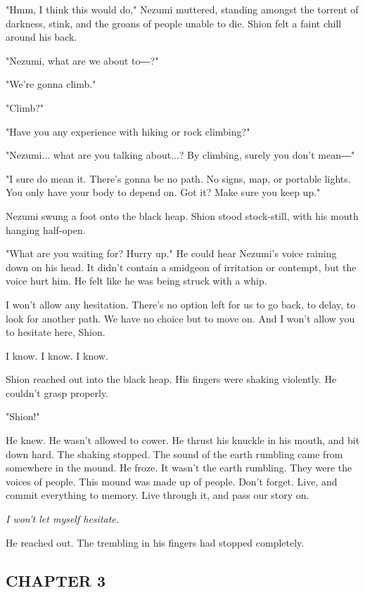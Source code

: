 "Hmm, I think this would do," Nezumi muttered, standing amongst the
torrent of darkness, stink, and the groans of people unable to die.
Shion felt a faint chill around his back.

"Nezumi, what are we about to―?"

"We're gonna climb."

"Climb?"

"Have you any experience with hiking or rock climbing?"

"Nezumi... what are you talking about...? By climbing, surely you don't
mean―"

"I sure do mean it. There's gonna be no path. No signs, map, or portable
lights. You only have your body to depend on. Got it? Make sure you keep
up."

Nezumi swung a foot onto the black heap. Shion stood stock-still, with
his mouth hanging half-open.

"What are you waiting for? Hurry up." He could hear Nezumi's voice
raining down on his head. It didn't contain a smidgeon of irritation or
contempt, but the voice hurt him. He felt like he was being struck with
a whip.

I won't allow any hesitation. There's no option left for us to go back,
to delay, to look for another path. We have no choice but to move on.
And I won't allow you to hesitate here, Shion.

I know. I know. I know.

Shion reached out into the black heap. His fingers were shaking
violently. He couldn't grasp properly.

"Shion!"

He knew. He wasn't allowed to cower. He thrust his knuckle in his mouth,
and bit down hard. The shaking stopped. The sound of the earth rumbling
came from somewhere in the mound. He froze. It wasn't the earth
rumbling. They were the voices of people. This mound was made up of
people. Don't forget. Live, and commit everything to memory. Live
through it, and pass our story on.

\emph{I won't let myself hesitate.}

He reached out. The trembling in his fingers had stopped completely.

\hypertarget{index_split_029.htmlux5cux23calibre_pb_66}{}

\protect\hypertarget{index_split_065.html}{}{}

\hypertarget{index_split_065.htmlux5cux23calibre_pb_0}{}

\hypertarget{index_split_065.htmlux5cux23calibre_toc_4}{%
\subsection{CHAPTER 3}\label{index_split_065.htmlux5cux23calibre_toc_4}}

